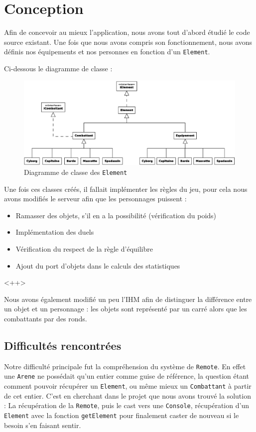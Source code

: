 \documentclass[12pt,a4paper,openany]{book}
\begin{document}
	\section{Conception}
		Afin de concevoir au mieux l'application, nous avons tout d'abord étudié le code source existant. Une fois que nous avons compris son fonctionnement,
		nous avons définis nos équipements et nos personnes en fonction d'un \texttt{Element}.

		Ci-dessous le diagramme de classe : 

		\begin{figure}[H]
			\centering
			\includegraphics[width=12cm]{Diagramme1.eps}
			\caption{Diagramme de classe des \texttt{Element}}
		\end{figure}

		Une fois ces classes créés, il fallait implémenter les règles du jeu, pour cela nous avons modifiés le serveur afin que les personnages puissent : 
		\begin{itemize}
			\item Ramasser des objets, s'il en a la possibilité (vérification du poids)
			\item Implémentation des duels
			\item Vérification du respect de la règle d'équilibre
			\item Ajout du port d'objets dans le calculs des statistiques
		\end{itemize}<++>

		Nous avons également modifié un peu l'IHM afin de distinguer la différence entre un objet et un personnage : les objets sont représenté par un carré
		alors que les combattants par des ronds.

		\subsection{Difficultés rencontrées}
		Notre difficulté principale fut la compréhension du système de \texttt{Remote}. En effet une \texttt{Arene} ne possédait qu'un
		entier comme guise de référence, la question étant comment pouvoir récupérer un \texttt{Element}, ou même mieux un \texttt{Combattant} à partir de cet
		entier. C'est en cherchant dans le projet que nous avons trouvé la solution : La récupération de la \texttt{Remote}, puis le cast vers une \texttt{Console}, récupération d'un
		\texttt{Element} avec la fonction \texttt{getElement} pour finalement caster de nouveau si le besoin s'en faisant sentir.
\end{document}
